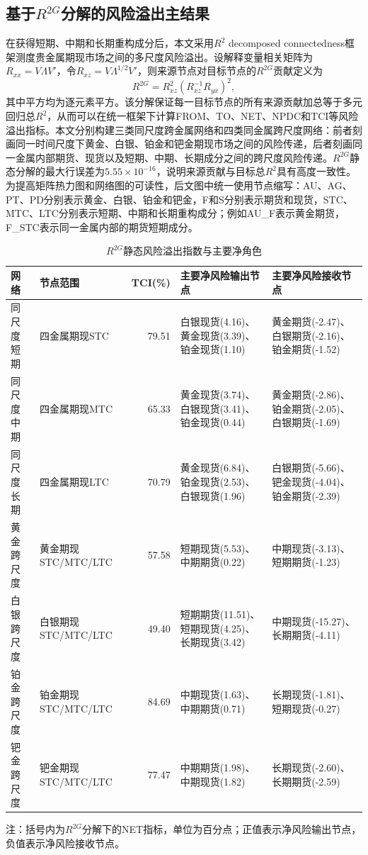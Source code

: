\documentclass[UTF8,zihao=-4,fontset=fandol]{ctexart}
\newenvironment{normaltable}{%
  \begin{center}\songti\zihao{5}\setlength{\baselineskip}{12pt}\selectfont\renewcommand{\arraystretch}{1.0}%
}{\end{center}}
\begin{document}
\subsection{基于\texorpdfstring{$R^{2G}$}{R2G}分解的风险溢出主结果}

在获得短期、中期和长期重构成分后，本文采用$R^{2}$ decomposed connectedness框架测度贵金属期现市场之间的多尺度风险溢出。设解释变量相关矩阵为$R_{xx}=V\Lambda V'$，令$R_{xz}=V\Lambda^{1/2}V'$，则来源节点对目标节点的$R^{2G}$贡献定义为
\[
R^{2G}=R_{xz}^{2}\left(R_{xz}^{-1}R_{yx}\right)^{2},
\]
其中平方均为逐元素平方。该分解保证每一目标节点的所有来源贡献加总等于多元回归总$R^{2}$，从而可以在统一框架下计算FROM、TO、NET、NPDC和TCI等风险溢出指标。本文分别构建三类同尺度跨金属网络和四类同金属跨尺度网络：前者刻画同一时间尺度下黄金、白银、铂金和钯金期现市场之间的风险传递，后者刻画同一金属内部期货、现货以及短期、中期、长期成分之间的跨尺度风险传递。$R^{2G}$静态分解的最大行误差为$5.55\times10^{-16}$，说明来源贡献与目标总$R^{2}$具有高度一致性。为提高矩阵热力图和网络图的可读性，后文图中统一使用节点缩写：AU、AG、PT、PD分别表示黄金、白银、铂金和钯金，F和S分别表示期货和现货，STC、MTC、LTC分别表示短期、中期和长期重构成分；例如AU\_F表示黄金期货，F\_STC表示同一金属内部的期货短期成分。

\begin{table}[H]
\caption{$R^{2G}$静态风险溢出指数与主要净角色}
\label{tab:strict-r2g-static-summary}
\begin{normaltable}
\begin{tabularx}{\textwidth}{llr>{\raggedright\arraybackslash}X>{\raggedright\arraybackslash}X}
\toprule
网络 & 节点范围 & TCI(\%) & 主要净风险输出节点 & 主要净风险接收节点 \\
\midrule
同尺度短期 & 四金属期现STC & 79.51 & 白银现货(4.16)、黄金现货(3.39)、铂金现货(1.10) & 黄金期货(-2.47)、白银期货(-2.16)、铂金期货(-1.52) \\
同尺度中期 & 四金属期现MTC & 65.33 & 黄金现货(3.74)、白银现货(3.41)、铂金现货(0.44) & 黄金期货(-2.86)、铂金期货(-2.05)、白银期货(-1.69) \\
同尺度长期 & 四金属期现LTC & 70.79 & 黄金现货(6.84)、铂金现货(2.53)、白银现货(1.96) & 白银期货(-5.66)、钯金现货(-4.04)、铂金期货(-2.39) \\
黄金跨尺度 & 黄金期现STC/MTC/LTC & 57.58 & 短期现货(5.53)、中期期货(0.22) & 中期现货(-3.13)、短期期货(-1.23) \\
白银跨尺度 & 白银期现STC/MTC/LTC & 49.40 & 短期期货(11.51)、短期现货(4.25)、长期现货(3.42) & 中期现货(-15.27)、长期期货(-4.11) \\
铂金跨尺度 & 铂金期现STC/MTC/LTC & 84.69 & 中期现货(1.63)、中期期货(0.71) & 长期现货(-1.81)、短期现货(-0.27) \\
钯金跨尺度 & 钯金期现STC/MTC/LTC & 77.47 & 中期期货(1.98)、中期现货(1.82) & 长期现货(-2.60)、长期期货(-2.59) \\
\bottomrule
\end{tabularx}
\end{normaltable}
\begin{flushleft}
{\songti{}注：括号内为$R^{2G}$分解下的NET指标，单位为百分点；正值表示净风险输出节点，负值表示净风险接收节点。}
\end{flushleft}
\end{table}
\end{document}
